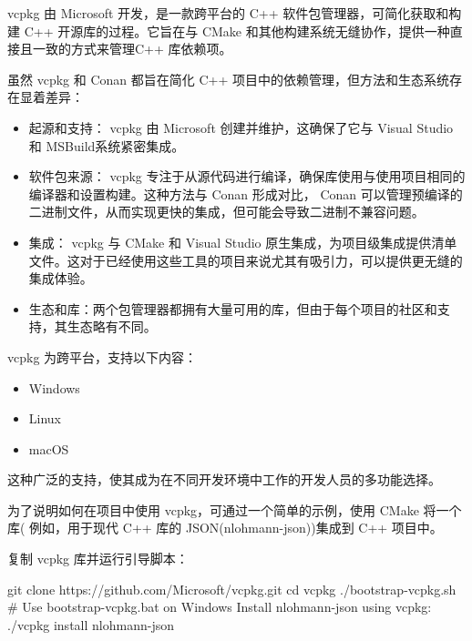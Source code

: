 
vcpkg 由 Microsoft 开发，是一款跨平台的 C++ 软件包管理器，可简化获取和构建 C++ 开源库的过程。它旨在与 CMake 和其他构建系统无缝协作，提供一种直接且一致的方式来管理C++ 库依赖项。


虽然 vcpkg 和 Conan 都旨在简化 C++ 项目中的依赖管理，但方法和生态系统存在显着差异：

\begin{itemize}
\item
起源和支持： vcpkg 由 Microsoft 创建并维护，这确保了它与 Visual Studio 和 MSBuild系统紧密集成。

\item
软件包来源： vcpkg 专注于从源代码进行编译，确保库使用与使用项目相同的编译器和设置构建。这种方法与 Conan 形成对比， Conan 可以管理预编译的二进制文件，从而实现更快的集成，但可能会导致二进制不兼容问题。

\item
集成： vcpkg 与 CMake 和 Visual Studio 原生集成，为项目级集成提供清单文件。这对于已经使用这些工具的项目来说尤其有吸引力，可以提供更无缝的集成体验。

\item
生态和库：两个包管理器都拥有大量可用的库，但由于每个项目的社区和支持，其生态略有不同。
\end{itemize}


vcpkg 为跨平台，支持以下内容：

\begin{itemize}
\item
Windows

\item
Linux

\item
macOS
\end{itemize}

这种广泛的支持，使其成为在不同开发环境中工作的开发人员的多功能选择。


为了说明如何在项目中使用 vcpkg，可通过一个简单的示例，使用 CMake 将一个库( 例如，用于现代 C++ 库的 JSON(nlohmann-json))集成到 C++ 项目中。

复制 vcpkg 库并运行引导脚本：

\begin{shell}
git clone https://github.com/Microsoft/vcpkg.git
cd vcpkg
./bootstrap-vcpkg.sh # Use bootstrap-vcpkg.bat on Windows
Install nlohmann-json using vcpkg:
./vcpkg install nlohmann-json
\end{shell}

